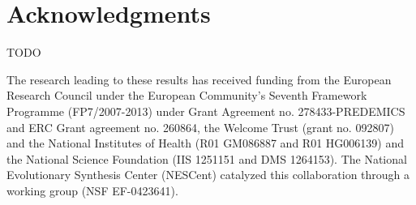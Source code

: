 
\chapter*{Acknowledgments}

TODO

\vfill{}

The research leading to these results has received funding from the European Research Council under the European Community's Seventh Framework Programme (FP7/2007-2013) under Grant Agreement no. 278433-PREDEMICS and ERC Grant agreement no. 260864, the Welcome Trust (grant no. 092807) and the National Institutes of Health (R01 GM086887 and R01 HG006139) and the National Science Foundation (IIS 1251151 and DMS 1264153).
The National Evolutionary Synthesis Center (NESCent) catalyzed this collaboration through a working group (NSF EF-0423641).
